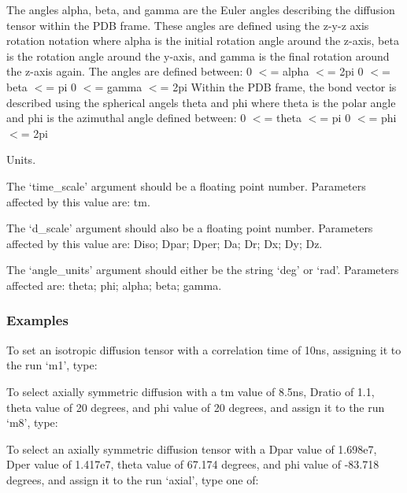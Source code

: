 The angles alpha, beta, and gamma are the Euler angles describing the diffusion tensor
within the PDB frame.  These angles are defined using the z-y-z axis rotation notation where
alpha is the initial rotation angle around the z-axis, beta is the rotation angle around the
y-axis, and gamma is the final rotation around the z-axis again.  The angles are defined
between:
    0 $<$= alpha $<$= 2pi
    0 $<$= beta $<$= pi
    0 $<$= gamma $<$= 2pi
Within the PDB frame, the bond vector is described using the spherical angels theta and phi
where theta is the polar angle and phi is the azimuthal angle defined between:
    0 $<$= theta $<$= pi
    0 $<$= phi $<$= 2pi


Units.

The `time\_scale' argument should be a floating point number.  Parameters affected by this
value are:  tm.

The `d\_scale' argument should also be a floating point number.  Parameters affected by this
value are:  Diso; Dpar; Dper; Da; Dr; Dx; Dy; Dz.

The `angle\_units' argument should either be the string `deg' or `rad'.  Parameters affected
are:  theta; phi; alpha; beta; gamma.



\subsubsection{Examples}

To set an isotropic diffusion tensor with a correlation time of 10ns, assigning it to the
run `m1', type:



To select axially symmetric diffusion with a tm value of 8.5ns, Dratio of 1.1, theta value
of 20 degrees, and phi value of 20 degrees, and assign it to the run `m8', type:


To select an axially symmetric diffusion tensor with a Dpar value of 1.698e7, Dper value of
1.417e7, theta value of 67.174 degrees, and phi value of -83.718 degrees, and assign it to
the run `axial', type one of:


